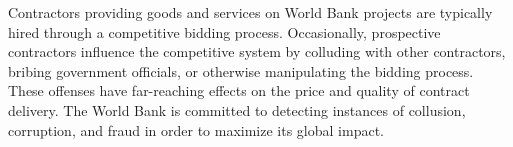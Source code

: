 Contractors providing goods and services on World Bank projects are typically hired through a competitive bidding process. Occasionally, prospective contractors influence the competitive system by colluding with other contractors, bribing government officials, or otherwise manipulating the bidding process. These offenses have far-reaching effects on the price and quality of contract delivery. The World Bank is committed to detecting instances of collusion, corruption, and fraud in order to maximize its global impact.